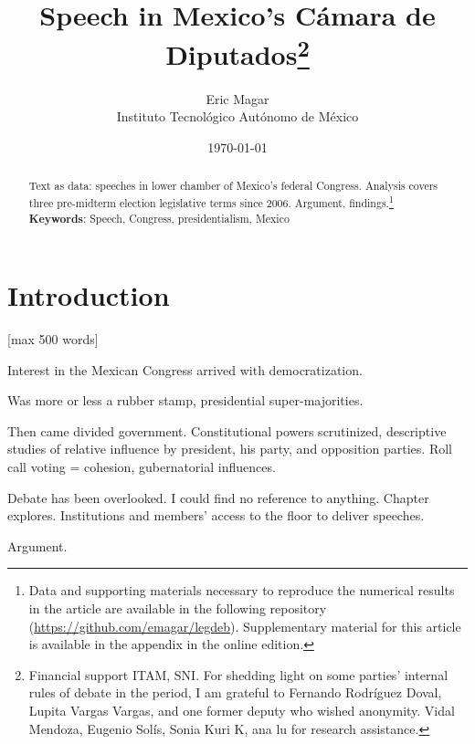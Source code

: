 \documentclass[letter,12pt]{article}
\begin{document}
\title{Speech in Mexico's Cámara de Diputados\thanks{Financial support ITAM, SNI. For shedding light on some parties' internal rules of debate in the period, I am grateful to Fernando Rodríguez Doval, Lupita Vargas Vargas, and one former deputy who wished anonymity. Vidal Mendoza, Eugenio Solís, Sonia Kuri K, ana lu for research assistance.}}
\author{Eric Magar \\ Instituto Tecnológico Autónomo de México}
\date{\today}
\maketitle


\begin{abstract}
\noindent Text as data: speeches in lower chamber of Mexico's federal Congress. Analysis covers three pre-midterm election legislative terms since 2006. Argument, findings.\footnote{{Data and supporting materials necessary to reproduce the numerical results in the article are available in the following repository (\url{https://github.com/emagar/legdeb}). Supplementary material for this article is available in the appendix in the online edition.}}
\newline
\newline
\textbf{Keywords}: Speech, Congress, presidentialism, Mexico 
\end{abstract}


\doublespacing

\section{Introduction} [max 500 words]

Interest in the Mexican Congress arrived with democratization.

Was more or less a rubber stamp, presidential super-majorities.

Then came divided government. Constitutional powers scrutinized, descriptive studies of relative influence by president, his party, and opposition parties. Roll call voting = cohesion, gubernatorial influences.

Debate has been overlooked. I could find no reference to anything. Chapter explores. Institutions and members' access to the floor to deliver speeches.

Argument. 
\end{document}
